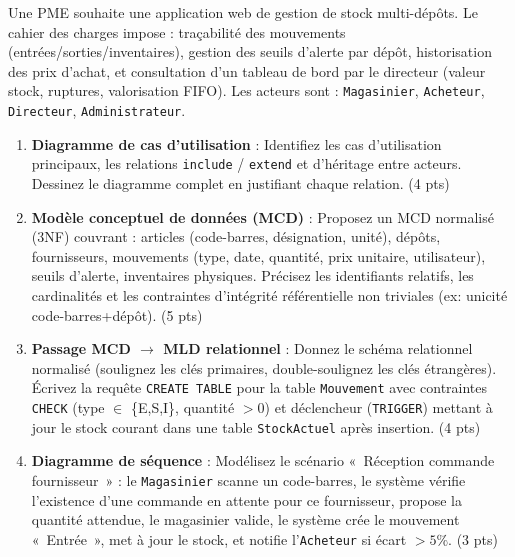 \documentclass[11pt]{article}
\begin{document}
\begin{exercice}
Une PME souhaite une application web de gestion de stock multi-dépôts. Le cahier des charges impose : traçabilité des mouvements (entrées/sorties/inventaires), gestion des seuils d'alerte par dépôt, historisation des prix d'achat, et consultation d'un tableau de bord par le directeur (valeur stock, ruptures, valorisation FIFO). Les acteurs sont : \texttt{Magasinier}, \texttt{Acheteur}, \texttt{Directeur}, \texttt{Administrateur}.

\begin{enumerate}
    \item \textbf{Diagramme de cas d'utilisation} : Identifiez les cas d'utilisation principaux, les relations \texttt{include} / \texttt{extend} et d'héritage entre acteurs. Dessinez le diagramme complet en justifiant chaque relation. (4 pts)
    \item \textbf{Modèle conceptuel de données (MCD)} : Proposez un MCD normalisé (3NF) couvrant : articles (code-barres, désignation, unité), dépôts, fournisseurs, mouvements (type, date, quantité, prix unitaire, utilisateur), seuils d'alerte, inventaires physiques. Précisez les identifiants relatifs, les cardinalités et les contraintes d'intégrité référentielle non triviales (ex: unicité code-barres+dépôt). (5 pts)
    \item \textbf{Passage MCD $\rightarrow$ MLD relationnel} : Donnez le schéma relationnel normalisé (soulignez les clés primaires, double-soulignez les clés étrangères). Écrivez la requête \texttt{CREATE TABLE} pour la table \texttt{Mouvement} avec contraintes \texttt{CHECK} (type $\in$ \{E,S,I\}, quantité $>0$) et déclencheur (\texttt{TRIGGER}) mettant à jour le stock courant dans une table \texttt{StockActuel} après insertion. (4 pts)
    \item \textbf{Diagramme de séquence} : Modélisez le scénario «~Réception commande fournisseur~» : le \texttt{Magasinier} scanne un code-barres, le système vérifie l'existence d'une commande en attente pour ce fournisseur, propose la quantité attendue, le magasinier valide, le système crée le mouvement «~Entrée~», met à jour le stock, et notifie l'\texttt{Acheteur} si écart $>5\%$. (3 pts)
\end{enumerate}
\end{exercice}
\end{document}
